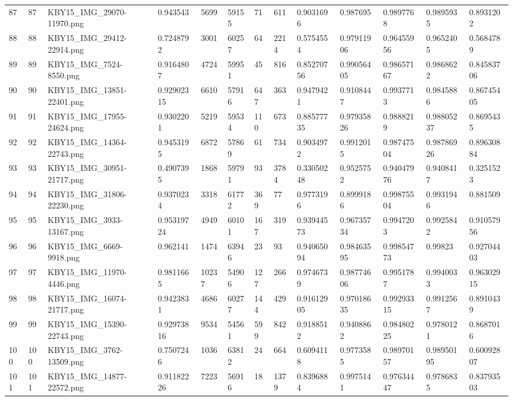\documentclass[11pt, a4paper, twoside]{report}
\begin{document}
\begin{longtable}[c]{@{}lllllllllllll@{}}
87 & 87 & KBY15\_IMG\_29070-11970.png & 0.943543 & 5699 & 59155 & 71 & 611 & 0.9031696 & 0.987695 & 0.9897768 & 0.9895935 & 0.8931202 \\
88 & 88 & KBY15\_IMG\_29412-22914.png & 0.7248792 & 3001 & 60257 & 64 & 2214 & 0.5754554 & 0.97911906 & 0.96455956 & 0.9652405 & 0.5684789 \\
89 & 89 & KBY15\_IMG\_7524-8550.png & 0.9164807 & 4724 & 59951 & 45 & 816 & 0.85270756 & 0.99056405 & 0.98657167 & 0.9868622 & 0.84583706 \\
90 & 90 & KBY15\_IMG\_13851-22401.png & 0.92902315 & 6610 & 57916 & 647 & 363 & 0.9479421 & 0.9108447 & 0.9937713 & 0.9845886 & 0.86745405 \\
91 & 91 & KBY15\_IMG\_17955-24624.png & 0.9302201 & 5219 & 59534 & 110 & 673 & 0.88577735 & 0.97935826 & 0.9888219 & 0.98805237 & 0.8695435 \\
92 & 92 & KBY15\_IMG\_14364-22743.png & 0.9453195 & 6872 & 57869 & 61 & 734 & 0.9034972 & 0.9912015 & 0.98747504 & 0.98786926 & 0.89630884 \\
93 & 93 & KBY15\_IMG\_30951-21717.png & 0.4907395 & 1868 & 59791 & 93 & 3784 & 0.33050248 & 0.9525752 & 0.94047976 & 0.9408417 & 0.3251523 \\
94 & 94 & KBY15\_IMG\_31806-22230.png & 0.9370234 & 3318 & 61772 & 369 & 77 & 0.9773196 & 0.8999186 & 0.99875504 & 0.9931946 & 0.881509 \\
95 & 95 & KBY15\_IMG\_3933-13167.png & 0.95319724 & 4949 & 60101 & 167 & 319 & 0.93944573 & 0.96735734 & 0.9947203 & 0.9925842 & 0.91057956 \\
96 & 96 & KBY15\_IMG\_6669-9918.png & 0.962141 & 1474 & 63946 & 23 & 93 & 0.94065094 & 0.98463595 & 0.99854773 & 0.99823 & 0.92704403 \\
97 & 97 & KBY15\_IMG\_11970-4446.png & 0.9811665 & 10237 & 54906 & 127 & 266 & 0.9746739 & 0.98774606 & 0.9951787 & 0.9940033 & 0.96302915 \\
98 & 98 & KBY15\_IMG\_16074-21717.png & 0.9423831 & 4686 & 60277 & 144 & 429 & 0.91612905 & 0.97018635 & 0.99293315 & 0.9912567 & 0.8910439 \\
99 & 99 & KBY15\_IMG\_15390-22743.png & 0.92973816 & 9534 & 54561 & 599 & 842 & 0.9188512 & 0.9408862 & 0.98480225 & 0.9780121 & 0.8687016 \\
100 & 100 & KBY15\_IMG\_3762-13509.png & 0.7507246 & 1036 & 63812 & 24 & 664 & 0.6094118 & 0.9773585 & 0.98970157 & 0.98950195 & 0.60092807 \\
101 & 101 & KBY15\_IMG\_14877-22572.png & 0.91182226 & 7223 & 56916 & 18 & 1379 & 0.8396884 & 0.9975141 & 0.97634447 & 0.9786835 & 0.83793503 \\

\end{longtable}
\end{document}
